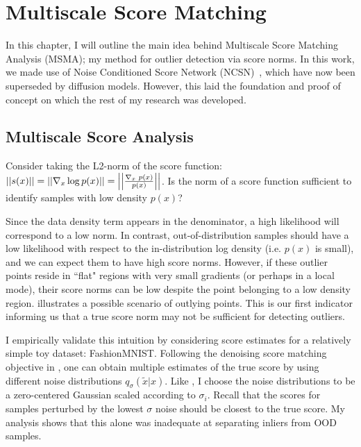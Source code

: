 \chapter{Multiscale Score Matching}
\label{ch:msma}

In this chapter, I will outline the main idea behind Multiscale Score Matching Analysis (MSMA); my method for outlier detection via score norms. In this work, we made use of Noise Conditioned Score Network (NCSN)~\cite{Song2019}, which have now been superseded by diffusion models. However, this laid the foundation and proof of concept on which the rest of my research was developed.

\section{Multiscale Score Analysis}

Consider taking the L2-norm of the score function:
$ \left|\left| { s(x) } \right|\right| = \left|\left| { \nabla_{x} \log p(x)  } \right|\right| = \left|\left| { \frac{\nabla_{x}\text{~}p(x)}{p(x)} } \right|\right| $. Is the norm of a score function sufficient to identify samples with low density $p(x)$?

Since the data density term appears in the denominator, a high likelihood will correspond to a low norm. In contrast, out-of-distribution samples should have a low likelihood with respect to the in-distribution log density (i.e. $p(x)$ is small), and we can expect them to have high score norms. However, if these outlier points reside in ``flat" regions with very small gradients (or perhaps in a local mode),  their score norms can be low despite the point belonging to a low density region. 
 illustrates a possible scenario of outlying points.
This is our first indicator informing us that a true score norm may not be sufficient for detecting outliers. 

I empirically validate this intuition by considering score estimates for a relatively simple toy dataset: FashionMNIST. Following the denoising score matching objective in , one can obtain multiple estimates of the true score by using different noise distributions $q_{\sigma}(\tilde{x}|x)$. Like \cite{Song2019}, I choose the noise distributions to be a zero-centered Gaussian scaled according to $\sigma_i$. Recall that the scores for samples perturbed by the lowest $\sigma$ noise should be closest to the true score. My analysis shows that this alone was inadequate at separating inliers from OOD samples.


